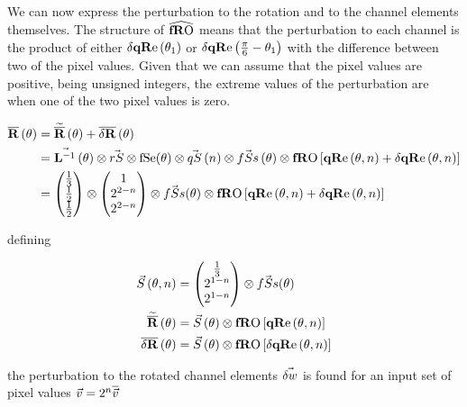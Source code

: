 We can now express the perturbation to the rotation and to the channel elements themselves. The structure of $\fROm$ means that the perturbation to each channel is the product of either $\dqRe[ \thetaA ]$ or $\dqRe[ \Pii{6} -\thetaA]$ with the difference between two of the pixel values. Given that we can assume that the pixel values are positive, being unsigned integers, the extreme values of the perturbation are when one of the two pixel values is zero.  

\begin{align*}
\nR[\theta] & = \nRa[\theta]+\dnR[\theta] \\
& = \nS[\theta] \otimes \rS \otimes \fSe (\theta) \otimes\qS[ n ] \otimes \fSs[\theta]  \otimes \fRO \left[ \qRe[ \theta, n ]  + \dqRe[ \theta, n ]  \right]  \\
& = 
\begin{pmatrix}
 \frac{1}{3}  \\
 \frac{1}{2}\\
 \frac{1}{2} \\
\end{pmatrix}
 \otimes
\begin{pmatrix}
 1  \\
 2^{2-n } \\
 2^{2-n }  \\
\end{pmatrix}
\otimes  \fSs(\theta) \otimes \fRO \left[ \qRe[ \theta, n ]  + \dqRe[ \theta, n ]  \right]   \\
\end{align*}


defining

\begin{align}\label{eq:scaleDef}
\Scale[\theta, n]   & =
\begin{pmatrix}
  \frac{1}{3} \\
 2^{1-n } \\
 2^{1-n }  \\
\end{pmatrix}
\otimes  \fSs(\theta)    \\
\nRa[\theta]   & =  \Scale[\theta] \otimes \fRO \left[   \qRe[ \theta, n ] \right]   \\
\dnR[\theta]   & =  \Scale[\theta] \otimes \fRO \left[ \dqRe[ \theta, n ] \right] \\
\end{align}


the perturbation to the rotated channel elements $\vec{\delta w}$ is found for an input set of pixel values $\vec{v}= 2^n\overline{\vec{v}} $

